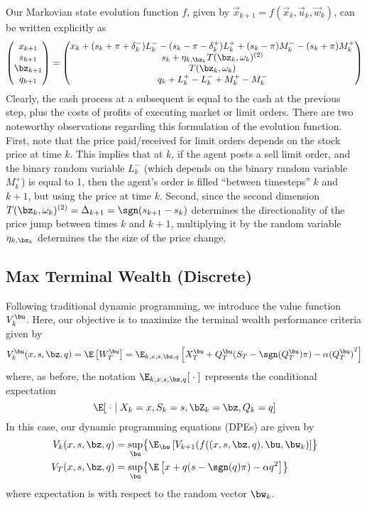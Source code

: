 \documentclass[12pt]{article}
\begin{document}
Our Markovian state evolution function $f$, given by $\vec{x}_{k+1} = f \left( \vec{x}_{k},\vec{u}_{k}, \vec{w}_{k} \right)$, can be written explicitly as
\begin{equation}
\label{eq:discretestateevolution}
\begin{pmatrix}
x_{k+1} \\
s_{k+1} \\
\bz_{k+1} \\
q_{k+1} 
\end{pmatrix} = \begin{pmatrix}
x_k + (s_k + \pi + \delta_k^-)L_k^- - (s_k - \pi - \delta_k^+)L_k^+ + (s_k - \pi)M_k^- - (s_k + \pi)M_k^+ \\
s_{k} + \eta_{k,\bz_k} T(\bz_k, \omega_k)^{(2)} \\
T(\bz_k, \omega_k) \\
q_{k} + L_k^+ - L_k^- + M_k^+ - M_k^-
\end{pmatrix}
\end{equation}
Clearly, the cash process at a subsequent is equal to the cash at the previous step, plus the costs of profits of executing market or limit orders. There are two noteworthy observations regarding this formulation of the evolution function. First, note that the price paid/received for limit orders depends on the stock price at time $k$. This implies that at $k$, if the agent posts a sell limit order, and the binary random variable $L_k^-$ (which depends on the binary random variable $M_k^+$) is equal to 1, then the agent's order is filled ``between timesteps'' $k$ and $k+1$, but using the price at time $k$. Second, since the second dimension $T(\bz_k, \omega_k)^{(2)} = \Delta_{k+1} = \sgn(s_{k+1} - s_k)$ determines the directionality of the price jump between times $k$ and $k+1$, multiplying it by the random variable $\eta_{k,\bz_k}$ determines the the size of the price change.

\subsection*{Max Terminal Wealth (Discrete)}
Following traditional dynamic programming, we introduce the value function $V_k^{\bu}$. Here, our objective is to maximize the terminal wealth performance criteria given by
\begin{equation}
V_k^{\bu} (x,s,\bz,q) = \E \left[ W_T^{\bu} \right] = \E_{k,x,s,\bz,q}\left[ X_T^{\bu} + Q_T^{\bu}(S_T - \sgn(Q_T^{\bu})\pi) - \alpha {(Q_T^{\bu})}^2 \right]
\end{equation}
where, as before, the notation $\E_{k,x,s,\bz,q}[ \; \cdot \; ]$ represents the conditional expectation
\[ \E [ \; \cdot \; | \; X_k = x, S_k = s, \bZ_k = \bz, Q_k = q] \]
In this case, our dynamic programming equations (DPEs) are given by
\begin{align}
V_k (x,s,\bz,q) & = \sup_{\bu} \bigl\lbrace \E_{\bw} \left[ V_{k+1} (f((x,s,\bz,q),\bu,\bw_k) \right] \bigr\rbrace \\
V_T (x,s,\bz,q) & = \sup_{\bu} \bigl\lbrace \E \left[ x + q(s-\sgn(q)\pi) - \alpha q^2 \right] \bigr\rbrace
\end{align}
where expectation is with respect to the random vector $\bw_k$.
\end{document}
